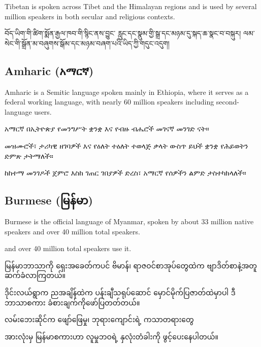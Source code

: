 \documentclass{article}
\begin{document}
Tibetan is spoken across Tibet and the Himalayan regions and is used by several million speakers in both secular and religious contexts.

བོད་ཡིག་གི་ཚིག་སྨོན་རྒྱལ་ཁབ་གི་སྙིང་ནས་བྱུང་
རླུང་དང་སྣུམ་གྱི་སྒྲ་དང་མཉམ་དུ་སྐད་ཆ་སྣང་བ་བསྐུར།
ལམ་སེང་གི་སྒྲོན་མ་བཞུགས་སྒོམ་དང་མཉམ་བཞག་པའི་ཡིད་ཀྱི་གདུང་འདུག།

\subsection{Amharic (አማርኛ)}\label{amharic}

Amharic is a Semitic language spoken mainly in Ethiopia, where it serves as a federal working language, with nearly 60 million speakers including second-language users.

አማርኛ በኢትዮጵያ የመንግሥት ቋንቋ እና የብዙ ብሔሮች መገናኛ መንገድ ናት።

መዝሙሮች፣ ታሪካዊ ዘገባዎች እና የዕለት ተዕለት ተወላጅ ቃላት ውስጥ ይህች ቋንቋ የሕይወትን ድምጽ ታትማለች።

ከከተማ መንገዶች ጀምሮ እስከ ገጠር ገበያዎች ድረስ፣ አማርኛ የሰዎችን ልምድ ታስተካክላለች።

\subsection{Burmese (မြန်မာ)}\label{burmese}

Burmese is the official language of Myanmar, spoken by about 33 million native speakers and over 40 million total speakers.

and over 40 million total speakers use it.

မြန်မာဘာသာကို ရှေးအခေတ်ကပင် ဗိမာန်၊ ရာဇဝင်စာအုပ်တွေထဲက ဗျာဒိတ်စာနဲ့အတူ ဆက်ခံလာကြတယ်။

ဒိုင်းလယ်ရွာက ညအချိန်ထဲက ပန်းချီသရုပ်ဆောင် မှောင်မိုက်ပြဇာတ်ထဲမှာပါ ဒီဘာသာစကား ခံစားချက်ကိုဖော်ပြတတ်တယ်။

လမ်းဘေးဆိုင်က ဖျော်ဖြေမှု၊ ဘုရားကျောင်းရဲ့ ဂာသာတရားတွေ

အားလုံးမှ မြန်မာစကားဟာ လူမှုဘဝရဲ့ နှလုံးတံခါးကို ဖွင့်ပေးနေပါတယ်။
\end{document}
